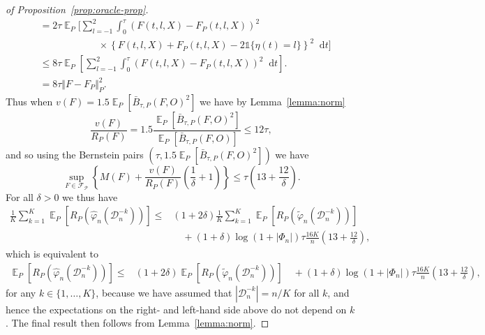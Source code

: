 \documentclass[a4paper,danish]{article}
\DeclareMathOperator{\E}{\mathbb{E}} %
\renewcommand{\phi}{\varphi}
\newcommand*\diff{\mathop{}\!\mathrm{d}}
\newcommand{\1}{\mathds{1}}
\newcommand{\data}{\ensuremath{\mathcal{D}}}
\theoremstyle{plain} %
\numberwithin{theorem}{section}
\theoremstyle{definition} %
\theoremstyle{remark}
\begin{document}
\begin{proof}[of Proposition~\ref{prop:oracle-prop}]
\begin{align*}
  & =2\tau
    \E_{P}\Bigg[
    \sum_{l=-1}^{2} \int_0^{\tau}
    \left(
    F(t, l, X) - F_P(t, l, X)
    \right)^2
  \\
  & \quad \quad \quad\quad \quad \quad \times
    \left\{
    F(t, l, X) +  F_P(t, l, X)-2 \1{\{\eta(t) = l\}}
    \right\}^2
    \diff t 
    \Bigg]
  \\
  & \leq
    8\tau \E_{P}{\left[
    \sum_{l=-1}^{2} \int_0^{\tau}
    \left(
    F(t, l, X) - F_P(t, l, X)
    \right)^2
    \diff t 
    \right]}.
  \\
  & =
    8\tau \Vert F - F_P \Vert_{P}^2.
\end{align*}
Thus when \( v(F) = 1.5 \E_P{[\bar{B}_{\tau,P}(F, O)^2]} \) we have by
Lemma~\ref{lemma:norm}
\begin{equation*}
  \frac{v(F)}{R_P(F)}
  = 1.5 \frac{\E_P{[\bar{B}_{\tau,P}(F, O)^2]}}{\E_P{[\bar{B}_{\tau,P}(F, O)]}}
  \leq 12 \tau,
\end{equation*}
and so using the Bernstein pairs \( (\tau, 1.5 \E_P{[\bar{B}_{\tau,P}(F, O)^2]}) \) we have
\begin{equation*}
  \sup_{F \in \mathcal{F}_{\mathcal{P}}}
  \left\{
    M(F) + \frac{v(F)}{R_P(F)}
    \left(
      \frac{1}{\delta} + 1
    \right)
  \right\}
  \leq \tau
  \left(
    13 + \frac{12}{\delta}
  \right).
\end{equation*}
For all $\delta>0$ we thus have
\begin{align*}
  \frac{1}{K} \sum_{k=1}^{K} \E_{P}{\left[ R_P(\hat{\phi}_n(\data_n^{-k})) \right]}
  \leq
  &(1+2\delta)\frac{1}{K} \sum_{k=1}^{K}\E_{P}{\left[ R_P(\tilde{\phi}_n(\data_n^{-k})) \right]}
  \\
  & \quad
    + (1+\delta)\log(1 + |\Phi_n|) \tau \frac{16 K}{n}
    \left(
    13 + \frac{12}{\delta}
    \right),
\end{align*}
which is equivalent to
\begin{align*}
   \E_{P}{\left[ R_P(\hat{\phi}_n(\data_n^{-k})) \right]}
  \leq
  &(1+2\delta) \E_{P}{\left[ R_P(\tilde{\phi}_n(\data_n^{-k})) \right]}
    \quad
    + (1+\delta)\log(1 + |\Phi_n|) \tau \frac{16 K}{n}
    \left(
    13 + \frac{12}{\delta}
    \right),
\end{align*}
for any \( k\in \{1, \dots, K\} \), because we have assumed that
\( |\data_n^{-k}| = n/K \) for all \( k \), and hence the expectations
on the right- and left-hand side above do not depend on \( k \). The
final result then follows from Lemma~\ref{lemma:norm}.
\end{proof}
\end{document}
